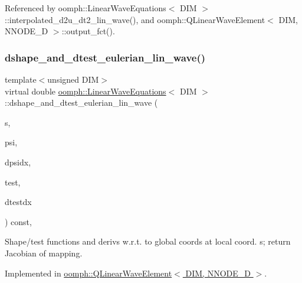 Referenced by oomph\+::\+Linear\+Wave\+Equations$<$ D\+I\+M $>$\+::interpolated\+\_\+d2u\+\_\+dt2\+\_\+lin\+\_\+wave(), and oomph\+::\+Q\+Linear\+Wave\+Element$<$ D\+I\+M, N\+N\+O\+D\+E\+\_\+D $>$\+::output\+\_\+fct().

\mbox{\label{classoomph_1_1LinearWaveEquations_a57ed864bd1ecad66fc115bf3b956e4c6}} 
\subsubsection{\texorpdfstring{dshape\+\_\+and\+\_\+dtest\+\_\+eulerian\+\_\+lin\+\_\+wave()}{dshape\_and\_dtest\_eulerian\_lin\_wave()}}
{\footnotesize\ttfamily template$<$unsigned D\+IM$>$ \\
virtual double \hyperlink{classoomph_1_1LinearWaveEquations}{oomph\+::\+Linear\+Wave\+Equations}$<$ D\+IM $>$\+::dshape\+\_\+and\+\_\+dtest\+\_\+eulerian\+\_\+lin\+\_\+wave (\begin{DoxyParamCaption}\item[{const \hyperlink{classoomph_1_1Vector}{Vector}$<$ double $>$ \&}]{s,  }\item[{\hyperlink{classoomph_1_1Shape}{Shape} \&}]{psi,  }\item[{\hyperlink{classoomph_1_1DShape}{D\+Shape} \&}]{dpsidx,  }\item[{\hyperlink{classoomph_1_1Shape}{Shape} \&}]{test,  }\item[{\hyperlink{classoomph_1_1DShape}{D\+Shape} \&}]{dtestdx }\end{DoxyParamCaption}) const\hspace{0.3cm}{\ttfamily [protected]}, {}}



Shape/test functions and derivs w.\+r.\+t. to global coords at local coord. s; return Jacobian of mapping. 



Implemented in \hyperlink{classoomph_1_1QLinearWaveElement_a97bfe7e067f0b8f3cf82b02ca1e7421e}{oomph\+::\+Q\+Linear\+Wave\+Element$<$ D\+I\+M, N\+N\+O\+D\+E\+\_\+D $>$}.



